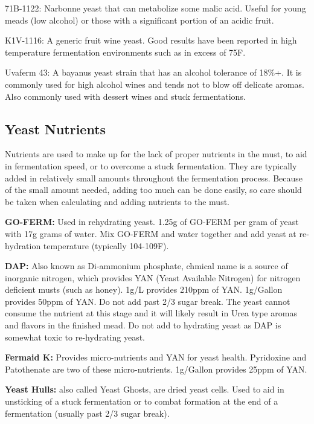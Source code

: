 \documentclass{article}
\begin{document}
  71B-1122: Narbonne yeast that can metabolize some malic acid. Useful for young meads (low alcohol) or those with a 
  significant portion of an acidic fruit.

  K1V-1116: A generic fruit wine yeast. Good results have been reported in high temperature fermentation environments such as in excess of 75\textdegree F.

  Uvaferm 43: A bayanus yeast strain that has an alcohol tolerance of 18\%+. It is commonly used for high alcohol wines and tends not to blow off 
  delicate aromas. Also commonly used with dessert wines and stuck fermentations. 

 \subsection{Yeast Nutrients}
  Nutrients are used to make up for the lack of proper nutrients in the must, to aid in fermentation speed, or to overcome a stuck fermentation. 
  They are typically added in relatively small amounts throughout the fermentation process. Because of the small amount needed, adding too 
  much can be done easily, so care should be taken when calculating and adding nutrients to the must.

  \textbf{GO-FERM:} Used in rehydrating yeast. 1.25g of GO-FERM per gram of yeast with 17g grams of water. Mix GO-FERM and water together  
  and add yeast at re-hydration temperature (typically 104-109F). 

  \textbf{DAP:} Also known as Di-ammonium phosphate, chmical name  is a source of inorganic nitrogen, which provides YAN 
  (Yeast Available Nitrogen) for nitrogen deficient musts (such as honey). 1g/L provides 210ppm of YAN. 1g/Gallon provides 50ppm of YAN. 
  Do not add past 2/3 sugar break. The yeast cannot consume the nutrient at this stage and it will likely result in Urea type aromas and 
  flavors in the finished mead. Do not add to hydrating yeast as DAP is somewhat toxic to re-hydrating yeast.

  \textbf{Fermaid K:} Provides micro-nutrients and YAN for yeast health. Pyridoxine and Patothenate are two of these micro-nutrients. 
  1g/Gallon provides 25ppm of YAN.

  \textbf{Yeast Hulls:} also called Yeast Ghosts, are dried yeast cells. Used to aid in unsticking of a stuck fermentation or to combat 
   formation at the end of a fermentation (usually past 2/3 sugar break).
  
\end{document}
